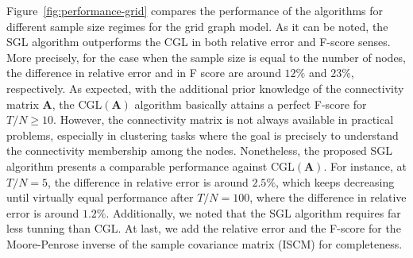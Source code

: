 Figure~\ref{fig:performance-grid} compares the performance of the algorithms for different
sample size regimes for the grid graph model. As it can be noted, the \textsf{SGL} algorithm outperforms the \textsf{CGL}
in both relative error and F-score senses. More precisely, for the case when the sample size is equal
to the number of nodes, the difference in relative error and in F score are around $12\%$ and $23\%$,
respectively. As expected, with the additional prior knowledge of the connectivity matrix $\mathbf{A}$,
the \textsf{CGL}$(\mathbf{A})$ algorithm basically attains a perfect F-score for $T / N \geq 10$.
However, the connectivity matrix is not always available in practical problems, especially in clustering
tasks where the goal is precisely to understand the connectivity membership among the nodes. Nonetheless,
the proposed \textsf{SGL} algorithm presents a comparable performance against \textsf{CGL}$(\mathbf{A})$.
For instance, at $T/N = 5$, the difference in relative error is around $2.5\%$, which keeps decreasing until
virtually equal performance after $T / N = 100$, where the difference in relative error is around $1.2 \%$.
Additionally, we noted that the \textsf{SGL} algorithm requires far less tunning than \textsf{CGL}.
At last, we add the relative error and the F-score for the Moore-Penrose inverse of the sample covariance matrix
(\textsf{ISCM}) for completeness.

